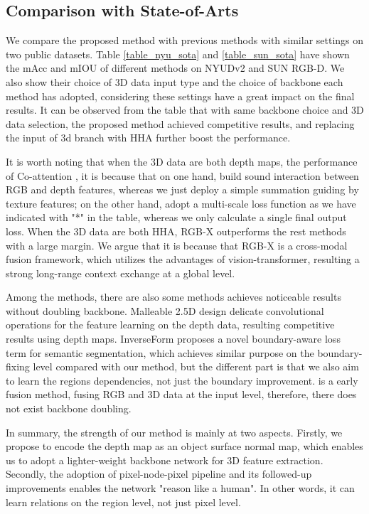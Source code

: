 ﻿\documentclass[journal]{IEEEtran}
\begin{document}
\subsection{Comparison with State-of-Arts}  
    We compare the proposed method with previous methods with similar settings on two public datasets. Table \ref{table_nyu_sota} and \ref{table_sun_sota} have shown the mAcc and mIOU of different methods on NYUDv2 and SUN RGB-D. We also show their choice of 3D data input type and the choice of backbone each method has adopted, considering these settings have a great impact on the final results. It can be observed from the table that with same backbone choice and 3D data selection, the proposed method achieved competitive results, and replacing the input of 3d branch
    with HHA further boost the performance. 
    
    It is worth noting that when the 3D data are both depth maps, the performance of Co-attention \cite{zhou2022canet}, it is because that on one hand, \cite{zhou2022canet} build sound interaction between RGB and depth features, whereas we just deploy a simple summation guiding by texture features; on the other hand, \cite{zhou2022canet} adopt a multi-scale loss function as we have indicated with "*" in the table, whereas we only calculate a single final output loss. When the 3D data are both HHA, RGB-X \cite{liu2022cmx} outperforms the rest methods with a large margin. We argue that it is because that RGB-X is a cross-modal fusion framework, which utilizes the advantages of vision-transformer, resulting a strong long-range context exchange at a global level.
    
    Among the methods, there are also some methods achieves noticeable results without doubling backbone. Malleable 2.5D \cite{2020malleable} design delicate convolutional operations for the feature learning on the depth data, resulting competitive results using depth maps. InverseForm \cite{borse2021inverseform} proposes a novel boundary-aware loss term for semantic segmentation, which achieves similar purpose on the boundary-fixing level compared with our method, but the different part is that we also aim to learn the regions dependencies, not just the boundary improvement. \cite{cao2021rgbxd} is a early fusion method, fusing RGB and 3D data at the input level, therefore, there does not exist backbone doubling. 
    
    In summary, the strength of our method is mainly at two aspects. Firstly, we propose to encode the depth map as an object surface normal map, which enables us to adopt a lighter-weight backbone network for 3D feature extraction. Secondly, the adoption of pixel-node-pixel pipeline and its followed-up improvements enables the network "reason like a human". In other words, it can learn relations on the region level, not just pixel level.
\end{document}
